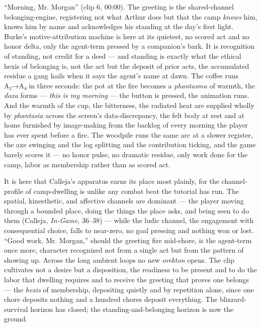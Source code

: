 \documentclass{article}
\begin{document}
``Morning, Mr. Morgan'' (clip 6, 00:00). The greeting is the shared-channel belonging-engine, registering not what Arthur does but that the camp \textit{knows} him, knows him by name and acknowledges his standing at the day's first light. Burke's motive-attribution machine is here at its quietest, no scored act and no honor delta, only the agent-term pressed by a companion's bark. It is recognition of standing, not credit for a deed — and standing is exactly what the ethical hexis of belonging is, not the act but the deposit of prior acts, the accumulated residue a gang hails when it says the agent's name at dawn. The coffee runs A₂→A₄ in three seconds: the pot at the fire becomes a \textit{phantasma} of warmth, the \textit{doxa} forms — \textit{this is my morning} — the button is pressed, the animation runs. And the warmth of the cup, the bitterness, the radiated heat are supplied wholly by \textit{phantasia} across the screen's data-discrepancy, the felt body at rest and at home furnished by image-making from the backlog of every morning the player has ever spent before a fire. The woodpile runs the same arc at a slower register, the axe swinging and the log splitting and the contribution ticking, and the game barely scores it — no honor pulse, no dramatic residue, only work done for the camp, labor as membership rather than as scored act.

It is here that Calleja's apparatus earns its place most plainly, for the channel-profile of camp-dwelling is unlike any combat beat the tutorial has run. The spatial, kinesthetic, and affective channels are dominant — the player moving through a bounded place, doing the things the place asks, and being seen to do them (Calleja, \textit{In-Game}, 36–38) — while the ludic channel, the engagement with consequential choice, falls to near-zero, no goal pressing and nothing won or lost. ``Good work, Mr. Morgan,'' should the greeting fire mid-chore, is the agent-term once more, character recognized not from a single act but from the pattern of showing up. Across the long ambient loops no new \textit{orekton} opens. The clip cultivates not a desire but a disposition, the readiness to be present and to do the labor that dwelling requires and to receive the greeting that proves one belongs — the \textit{hexis} of membership, depositing quietly and by repetition alone, since one chore deposits nothing and a hundred chores deposit everything. The blizzard-survival horizon has closed; the standing-and-belonging horizon is now the ground.
\end{document}
